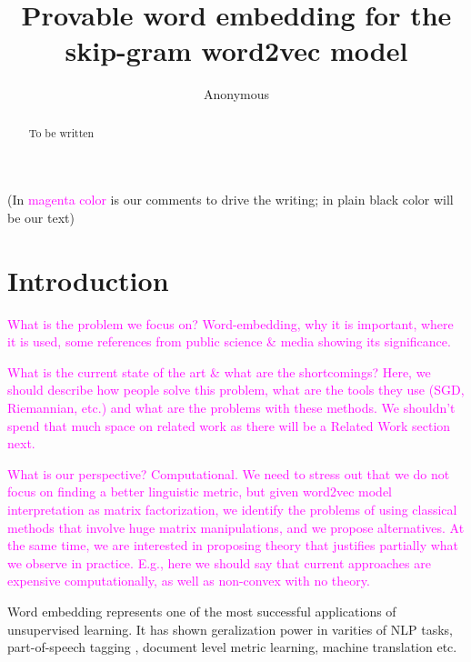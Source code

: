 \documentclass[letterpaper]{article} %
\begin{document}
%

\title{Provable word embedding for the skip-gram word2vec model}

\author{Anonymous}

\maketitle

\begin{abstract}
To be written
\end{abstract}

(In \textcolor{magenta}{magenta color} is our comments to drive the writing; in plain black color will be our text)

\section{Introduction}
\textcolor{magenta}{What is the problem we focus on? Word-embedding, why it is important, where it is used, some references from public science \& media showing its significance.}

\textcolor{magenta}{What is the current state of the art \& what are the shortcomings? Here, we should describe how people solve this problem, what are the tools they use (SGD, Riemannian, etc.) and what are the problems with these methods. We shouldn't spend that much space on related work as there will be a Related Work section next.}

\textcolor{magenta}{What is our perspective? Computational. We need to stress out that we do not focus on finding a better linguistic metric, but given word2vec model interpretation as matrix factorization, we identify the problems of using classical methods that involve huge matrix manipulations, and we propose alternatives. At the same time, we are interested in proposing theory that justifies partially what we observe in practice. E.g., here we should say that current approaches are expensive computationally, as well as non-convex with no theory.}

Word embedding represents one of the most successful applications of unsupervised learning. It has shown geralization power in varities of NLP tasks, part-of-speech tagging \cite{abka2016evaluating}, document level metric learning\cite{kusner2015word}, machine translation \cite{NIPS2013_5021}\cite{zou2013bilingual} etc.
\end{document}
